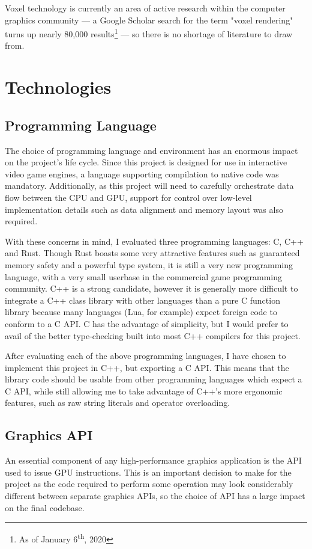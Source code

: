 Voxel technology is currently an area of active research within the computer graphics community --- a Google Scholar search for the term "voxel rendering" turns up nearly 80,000 results\footnote{As of January 6\textsuperscript{th}, 2020} --- so there is no shortage of literature to draw from. 


\section{Technologies}
\subsection{Programming Language}
The choice of programming language and environment has an enormous impact on the project's life cycle. Since this project is designed for use in interactive video game engines, a language supporting compilation to native code was mandatory. Additionally, as this project will need to carefully orchestrate data flow between the CPU and GPU, support for control over low-level implementation details such as data alignment and memory layout was also required.

With these concerns in mind, I evaluated three programming languages: C, C++ and Rust. Though Rust boasts some very attractive features such as guaranteed memory safety and a powerful type system, it is still a very new programming language, with a very small userbase in the commercial game programming community. C++ is a strong candidate, however it is generally more difficult to integrate a C++ class library with other languages than a pure C function library because many languages (Lua, for example) expect foreign code to conform to a C API. C has the advantage of simplicity, but I would prefer to avail of the better type-checking built into most C++ compilers for this project.

After evaluating each of the above programming languages, I have chosen to implement this project in C++, but exporting a C API. This means that the library code should be usable from other programming languages which expect a C API, while still allowing me to take advantage of C++'s more ergonomic features, such as raw string literals and operator overloading. 

\subsection{Graphics API}
An essential component of any high-performance graphics application is the API used to issue GPU instructions. This is an important decision to make for the project as the code required to perform some operation may look considerably different between separate graphics APIs, so the choice of API has a large impact on the final codebase.

